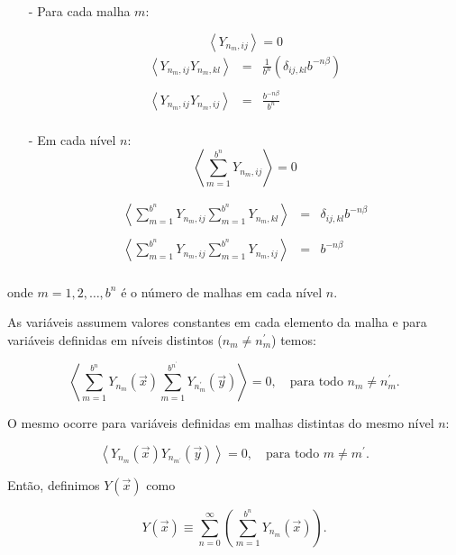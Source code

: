 \documentclass[12pt,a4paper,portuges]{article}
\newcommand{\Y}{{Y}}
\begin{document}
\begin{itemize}

\item[-] Para cada malha $m$:

	\[
	\left\langle {\Y}_{n_m,ij} \right\rangle = 0
	\]
	\[
	\begin{array}{lcl}
	\left\langle {\Y}_{n_m,ij} {\Y}_{n_m,kl} \right\rangle
		&=&
	\displaystyle \frac{1}{b^n} \left( \delta_{ij,kl} b^{-n \beta} \right)\\ 		\\
	\left\langle {\Y}_{n_m,ij} {\Y}_{n_m,ij} \right\rangle
	        &=&
	\displaystyle \frac{b^{-n \beta}}{b^n}\\
	\end{array}
	\]

\item[-] Em cada nível $n$:
	\[
		\left\langle \sum^{b^n}_{m=1} {\Y}_{n_m,ij} \right\rangle = 0
	\]

	\[
	\begin{array}{rcl}
	\displaystyle \left\langle \sum^{b^n}_{m=1} {\Y}_{n_m,ij} \sum^{b^n}_{m=1} {\Y}_{n_m,kl}
\right\rangle
		&=&
	\delta_{ij,kl} b^{-n \beta}\\ \\
	\displaystyle \left\langle \sum^{b^n}_{m=1} {\Y}_{n_m,ij} \sum^{b^n}_{m=1} {\Y}_{n_m,ij}
\right\rangle
		&=&
	b^{-n \beta}\\
	\end{array}
	\]
\end{itemize}

\noindent onde $m=1,2,\dots,b^{n}$ é o número de malhas em cada nível $n$.

As variáveis assumem valores constantes em cada elemento da malha e para variáveis definidas em
níveis distintos ($n_m \neq n^\prime_m$) temos:

\[
	\left\langle \sum^{b^n}_{m=1} {\Y}_{n_m}(\vec{x})
	\sum^{b^{n^\prime}}_{m=1}{\Y}_{n^\prime_m}(\vec{y}) \right\rangle = 0,
	\quad \mbox{para todo $n_m \neq n^\prime_m$.}
\]

\noindent O mesmo ocorre para variáveis definidas em malhas distintas do mesmo nível $n$:

\[
	\left\langle {\Y}_{n_m}(\vec{x}) {\Y}_{n_{m^\prime}}(\vec{y}) \right\rangle = 0,
	\quad \mbox{para todo $m \neq m^\prime$.}
\]

Então, definimos $\Y(\vec{x})$ como

\begin{equation}
	\Y(\vec{x}) \equiv \sum^\infty_{n=0}
			\left( \sum^{b^n}_{m=1}
			{\Y}_{n_m}(\vec{x}) \right).
\label{m2}
\end{equation}
\end{document}
